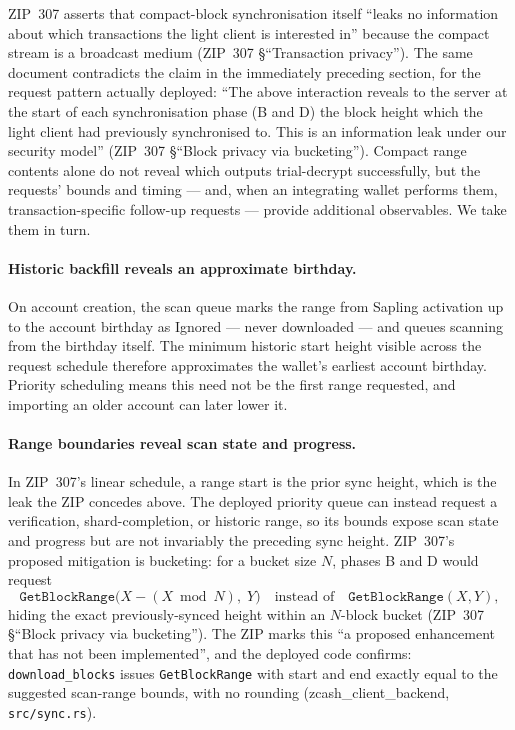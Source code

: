 \documentclass[11pt,a4paper]{article}
\theoremstyle{definition}
\begin{document}
ZIP~307 asserts that compact-block synchronisation itself ``leaks no
information about which transactions the light client is interested in''
because the compact stream is a broadcast medium
(ZIP~307 \S``Transaction privacy''). The same document contradicts the
claim in the immediately preceding section, for the request pattern
actually deployed:
``The above interaction reveals to the server at the start of each
synchronisation phase (B and D) the block height which the light client had
previously synchronised to. This is an information leak under our security
model'' (ZIP~307 \S``Block privacy via bucketing''). Compact range contents
alone do not reveal which outputs trial-decrypt successfully, but the
requests' bounds and timing --- and, when an integrating wallet performs
them, transaction-specific follow-up requests --- provide additional
observables. We take them in turn.

\paragraph{Historic backfill reveals an approximate birthday.} On account
creation,
the scan queue marks the range from Sapling activation up to the account
birthday as \textsf{Ignored} --- never downloaded --- and queues scanning
from the birthday itself. The minimum historic start height visible across
the request schedule therefore approximates the wallet's earliest account
birthday. Priority scheduling means this need not be the first range
requested, and importing an older account can later lower it.

\paragraph{Range boundaries reveal scan state and progress.} In ZIP~307's
linear schedule, a range start is the prior sync height, which is the leak
the ZIP concedes above. The deployed priority queue can instead request a
verification, shard-completion, or historic range, so its bounds expose
scan state and progress but are not invariably the preceding sync height.
ZIP~307's proposed mitigation is bucketing: for a bucket
size $N$, phases \textsf{B} and \textsf{D} would request
\[
  \texttt{GetBlockRange}\bigl(X - (X \bmod N),\; Y\bigr)
  \quad\text{instead of}\quad
  \texttt{GetBlockRange}(X, Y),
\]
hiding the exact previously-synced height within an $N$-block bucket
(ZIP~307 \S``Block privacy via bucketing''). The ZIP marks this ``a
proposed enhancement that has not been implemented'', and the deployed code
confirms: \texttt{download\_blocks} issues \texttt{GetBlockRange} with
start and end exactly equal to the suggested scan-range bounds, with no
rounding (\textsf{zcash\_client\_backend}, \texttt{src/sync.rs}).
\end{document}
